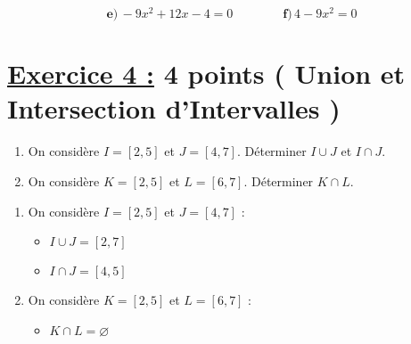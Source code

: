 \documentclass[12pt,a4paper]{article}
\begin{document}
\[
\textbf{e)} \, -9x^2 + 12x - 4 = 0 \quad\quad\quad\quad \textbf{f)} \, 4 - 9x^2 =0
\]



\section*{\underline{Exercice 4 :} 4 points ( Union et Intersection d'Intervalles )}  

\begin{enumerate}  
\item On considère \( I = [2, 5] \) et \( J = [4, 7] \). Déterminer \( I \cup J \) et \( I \cap J \).  

\item On considère \( K = [2, 5] \) et \( L = [6, 7] \). Déterminer \( K \cap L \).  
\end{enumerate}

\begin{enumerate}
    \item On considère $I = [2, 5]$ et $J = [4, 7]$ :
    \begin{itemize}
        \item $I \cup J = [2, 7]$
        \item $I \cap J = [4, 5]$
    \end{itemize}

    \item On considère $K = [2, 5]$ et $L = [6, 7]$ :
    \begin{itemize}
        \item $K \cap L = \varnothing$
    \end{itemize}
\end{enumerate}
\end{document}
